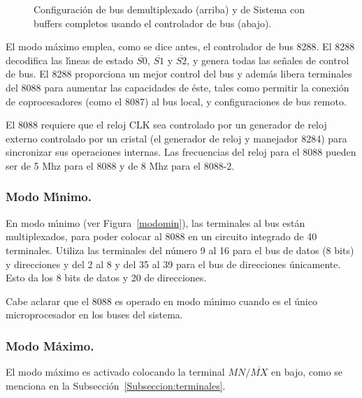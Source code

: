 \begin{figure}[!hbt]
\vskip 15mm
\vskip 115mm
\caption{Configuraci\'on de bus demultiplexado (arriba) y de Sistema con buffers completos %
usando el controlador de bus (abajo).}
\label{demultiplexado}
\end{figure}

El modo m\'aximo emplea, como se dice antes, el controlador de bus 8288. El 8288  decodifica las %
l\'{\i}neas de estado $\overline{S0}$, $\overline{S1}$ y $\overline{S2}$, y genera %
todas las se\~nales de control de bus. El 8288 proporciona un mejor control del bus %
\cite{Intel:Micro} y adem\'as libera terminales del 8088 para aumentar las capacidades de %
\'este, tales como permitir la conexi\'on de coprocesadores (como el 8087) al bus local, y %
configuraciones de bus remoto. 

El 8088 requiere que el reloj CLK sea controlado por un generador de reloj externo controlado %
por un cristal (el generador de reloj y manejador 8284) para sincronizar sus operaciones %
internas. Las frecuencias del reloj para el 8088 pueden ser de 5 Mhz para el 8088 y de 8 Mhz %
para el 8088-2.


\subsubsection{Modo M\'{\i}nimo.}
\label{Subsubsection:modominimo}

En modo m\'{\i}nimo (ver Figura~\ref{modomin}), las terminales al bus est\'an multiplexados, %
para poder colocar al 8088 en un circuito integrado de 40 terminales. Utiliza las terminales del %
n\'umero 9 al 16 para el bus de datos (8 bits) y direcciones y del 2 al 8 y del 35 al 39 para el %
bus de direcciones \'unicamente. Esto da los 8 bits de datos y 20 de direcciones. 

Cabe aclarar que el 8088 es operado en modo m\'{\i}nimo cuando es el \'unico microprocesador %
en los buses del sistema.


\subsubsection{Modo M\'aximo.}
\label{Subsubseccion:modomaximo}

El modo m\'aximo es activado colocando la terminal $MN/\overline{MX}$ en bajo, como se %
menciona en la Subsecci\'on~\ref{Subseccion:terminales}. 

